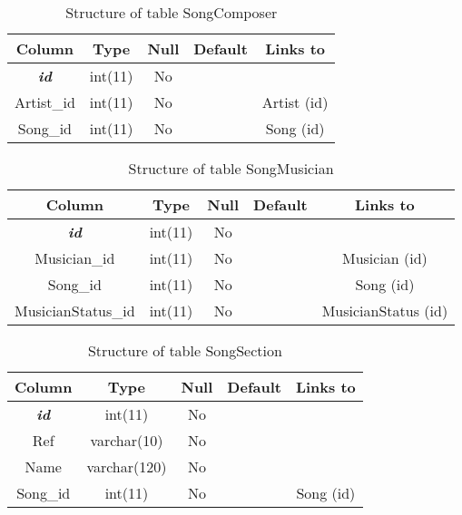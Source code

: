%
%
\begin{longtable}{|c|c|c|c|c|} 
\caption{Structure of table SongComposer} 
\label{tab:SongComposer-structure} \\
\hline \multicolumn{1}{|c|}{\textbf{Column}} & \multicolumn{1}{|c|}{\textbf{Type}} & \multicolumn{1}{|c|}{\textbf{Null}} & \multicolumn{1}{|c|}{\textbf{Default}} & \multicolumn{1}{|c|}{\textbf{Links to}} \\ 
\hline
\textbf{\textit{id}} & int(11) & No &  &  \\ 
\hline 
Artist\_id & int(11) & No &  & Artist (id) \\ 
\hline 
Song\_id & int(11) & No &  & Song (id) \\ 
\hline 
\end{longtable}

%
%
\begin{longtable}{|c|c|c|c|c|} 
\caption{Structure of table SongMusician} 
\label{tab:SongMusician-structure} \\
\hline \multicolumn{1}{|c|}{\textbf{Column}} & \multicolumn{1}{|c|}{\textbf{Type}} & \multicolumn{1}{|c|}{\textbf{Null}} & \multicolumn{1}{|c|}{\textbf{Default}} & \multicolumn{1}{|c|}{\textbf{Links to}} \\ 
\hline
\textbf{\textit{id}} & int(11) & No &  &  \\ 
\hline 
Musician\_id & int(11) & No &  & Musician (id) \\ 
\hline 
Song\_id & int(11) & No &  & Song (id) \\ 
\hline 
MusicianStatus\_id & int(11) & No &  & MusicianStatus (id) \\ 
\hline 
\end{longtable}

%
%
\begin{longtable}{|c|c|c|c|c|} 
\caption{Structure of table SongSection} 
\label{tab:SongSection-structure} \\
\hline 
\multicolumn{1}{|c|}{\textbf{Column}} & \multicolumn{1}{|c|}{\textbf{Type}} & \multicolumn{1}{|c|}{\textbf{Null}} & \multicolumn{1}{|c|}{\textbf{Default}} & \multicolumn{1}{|c|}{\textbf{Links to}} \\ 
\hline
\textbf{\textit{id}} & int(11) & No &  &  \\ 
\hline 
Ref & varchar(10) & No &  &  \\ 
\hline 
Name & varchar(120) & No &  &  \\ 
\hline 
Song\_id & int(11) & No &  & Song (id) \\ 
\hline 
\end{longtable}

